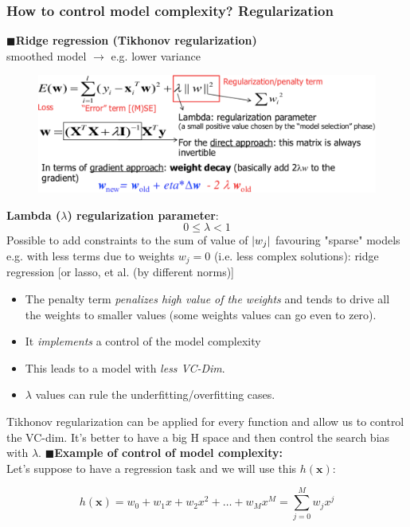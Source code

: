 \documentclass[../main.tex]{subfiles}
\begin{document}
\subsubsection{How to control model complexity? Regularization}
\noindent$\blacksquare$\textbf{Ridge regression (Tikhonov regularization)}\\
smoothed model $\rightarrow$ e.g. lower variance
\begin{figure}[H]
    \centering
    \includegraphics[scale = 0.3]{lectures/2_linear_model/tikhonov.png}
    \label{fig:2_tikhonov}
\end{figure}
\textbf{Lambda ($\lambda$) regularization parameter}: 
$$ 0\leq \lambda < 1$$
Possible to add constraints to the sum of value of $\lvert w_j\rvert$ favouring "sparse" models e.g. with less terms due to weights $w_j=0$ (i.e. less complex solutions): ridge regression [or lasso, et al. (by different norms)]

\begin{itemize}
    \item The penalty term \emph{penalizes high value of the weights} and tends to drive all the weights to smaller values (some weights values can go even to zero).
    \item It \emph{implements} a control of the model complexity
    \item This leads to a model with \emph{less VC-Dim}.
    \item $\lambda$ values can rule the underfitting/overfitting cases.
\end{itemize}
Tikhonov regularization can be applied for every function and allow us to control the VC-dim. It's better to have a big H space and then control the search bias with $\lambda$.
\newpage
\noindent$\blacksquare$\textbf{Example of control of model complexity:}\\
Let's suppose to have a regression task and we will use this $h(\mathbf{x})$:

$$ h(\mathbf{x}) = w_0 + w_1x + w_2x^2 + \dots + w_Mx^M = \sum_{j = 0}^M w_jx^j$$
\end{document}
